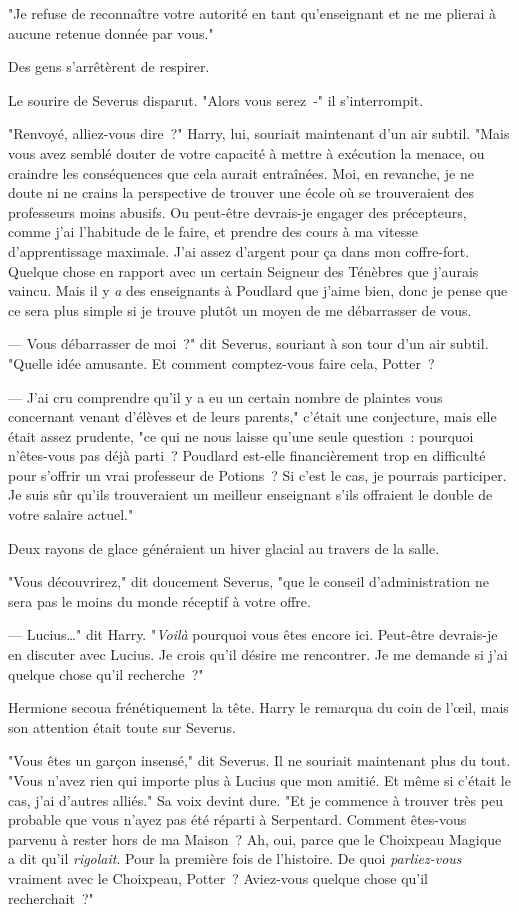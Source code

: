 "Je refuse de reconnaître votre autorité en tant qu'enseignant et ne me plierai à aucune retenue donnée par vous."

Des gens s'arrêtèrent de respirer.

Le sourire de Severus disparut. "Alors vous serez~-" il s'interrompit.

"Renvoyé, alliez-vous dire~?" Harry, lui, souriait maintenant d'un air subtil. "Mais vous avez semblé douter de votre capacité à mettre à exécution la menace, ou craindre les conséquences que cela aurait entraînées. Moi, en revanche, je ne doute ni ne crains la perspective de trouver une école où se trouveraient des professeurs moins abusifs. Ou peut-être devrais-je engager des précepteurs, comme j'ai l'habitude de le faire, et prendre des cours à ma vitesse d'apprentissage maximale. J'ai assez d'argent pour ça dans mon coffre-fort. Quelque chose en rapport avec un certain Seigneur des Ténèbres que j'aurais vaincu. Mais il y \emph{a} des enseignants à Poudlard que j'aime bien, donc je pense que ce sera plus simple si je trouve plutôt un moyen de me débarrasser de vous.

--- Vous débarrasser de moi~?" dit Severus, souriant à son tour d'un air subtil. "Quelle idée amusante. Et comment comptez-vous faire cela, Potter~?

--- J'ai cru comprendre qu'il y a eu un certain nombre de plaintes vous concernant venant d'élèves et de leurs parents," c'était une conjecture, mais elle était assez prudente, "ce qui ne nous laisse qu'une seule question~: pourquoi n'êtes-vous pas déjà parti~? Poudlard est-elle financièrement trop en difficulté pour s'offrir un vrai professeur de Potions~? Si c'est le cas, je pourrais participer. Je suis sûr qu'ils trouveraient un meilleur enseignant s'ils offraient le double de votre salaire actuel."

Deux rayons de glace généraient un hiver glacial au travers de la salle.

"Vous découvrirez," dit doucement Severus, "que le conseil d'administration ne sera pas le moins du monde réceptif à votre offre.

--- Lucius…" dit Harry. "\emph{Voilà} pourquoi vous êtes encore ici. Peut-être devrais-je en discuter avec Lucius. Je crois qu'il désire me rencontrer. Je me demande si j'ai quelque chose qu'il recherche~?"

Hermione secoua frénétiquement la tête. Harry le remarqua du coin de l'œil, mais son attention était toute sur Severus.

"Vous êtes un garçon insensé," dit Severus. Il ne souriait maintenant plus du tout. "Vous n'avez rien qui importe plus à Lucius que mon amitié. Et même si c'était le cas, j'ai d'autres alliés." Sa voix devint dure. "Et je commence à trouver très peu probable que vous n'ayez pas été réparti à Serpentard. Comment êtes-vous parvenu à rester hors de ma Maison~? Ah, oui, parce que le Choixpeau Magique a dit qu'il \emph{rigolait}. Pour la première fois de l'histoire. De quoi \emph{parliez-vous} vraiment avec le Choixpeau, Potter~? Aviez-vous quelque chose qu'il recherchait~?"

